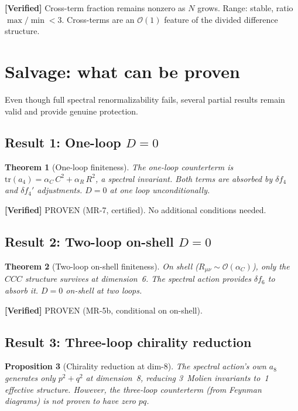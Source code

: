 \documentclass[11pt,a4paper]{article}
\newcommand{\order}{\mathcal{O}}
\newcommand{\tr}{\mathrm{tr}}
\newtheorem{theorem}{Theorem}[section]
\newtheorem{proposition}[theorem]{Proposition}
\theoremstyle{definition}
\newcommand{\verified}[1]{%
  \par\smallskip\noindent
  \colorbox{green!10}{\parbox{\dimexpr\linewidth-2\fboxsep}{%
    \textcolor{proven}{\textbf{[Verified]}} #1}}%
  \par\smallskip}
\begin{document}
\verified{%
  Cross-term fraction remains nonzero as $N$ grows.  Range: stable, ratio
  $\max/\min < 3$.  Cross-terms are an $\order(1)$ feature of the divided
  difference structure.}


\section{Salvage: what can be proven}\label{sec:salvage}

Even though full spectral renormalizability fails, several partial results
remain valid and provide genuine protection.

\subsection{Result 1: One-loop $D = 0$}

\begin{theorem}[One-loop finiteness]\label{thm:one-loop}
The one-loop counterterm is $\tr(a_4) = \alpha_C\, C^2 + \alpha_R\, R^2$,
a spectral invariant.  Both terms are absorbed by $\delta f_4$ and
$\delta f_4'$ adjustments.  $D = 0$ at one loop unconditionally.
\end{theorem}

\verified{\textcolor{proven}{PROVEN} (MR-7, certified).  No additional
conditions needed.}

\subsection{Result 2: Two-loop on-shell $D = 0$}

\begin{theorem}[Two-loop on-shell finiteness]\label{thm:two-loop}
On shell ($R_{\mu\nu} \sim \order(\alpha_C)$), only the $CCC$ structure
survives at dimension~6.  The spectral action provides $\delta f_6$ to absorb
it.  $D = 0$ on-shell at two loops.
\end{theorem}

\verified{\textcolor{proven}{PROVEN} (MR-5b, conditional on on-shell).}

\subsection{Result 3: Three-loop chirality reduction}

\begin{proposition}[Chirality reduction at dim-8]\label{prop:dim8}
The spectral action's own $a_8$ generates only $p^2 + q^2$ at dimension~8,
reducing 3~Molien invariants to~1 effective structure.  However, the three-loop
\emph{counterterm} (from Feynman diagrams) is not proven to have zero $pq$.
\end{proposition}
\end{document}
